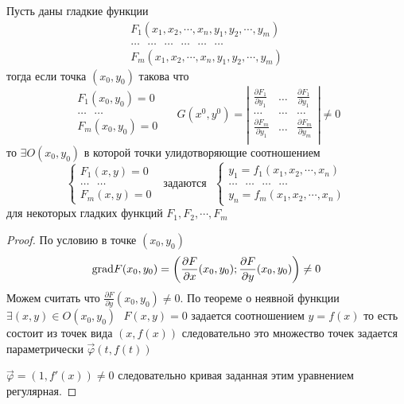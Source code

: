 \begin{theorem}
  Пусть  даны гладкие функции
  $$
  \begin{array}{c}
    F_1 (x_1, x_2, \cdots, x_n, y_1, y_2, \cdots, y_m) \\
    \dots ~~~ \dots ~~~ \dots ~~~ \dots  ~~~ \dots ~~~ \dots \\
    F_m (x_1, x_2, \cdots, x_n, y_1, y_2, \cdots, y_m)
  \end{array}
  $$
  тогда если точка $(x_0, y_0)$ такова что
  $$
  \begin{array}{c}
    F_1(x_0, y_0) = 0 \\
    \ldots ~~~ \ldots \\
    F_m(x_0, y_0) = 0 \\
  \end{array} ~~~~~~
  G(x^0, y^0) = \left|
  \begin{array}{ccc}
    \frac{\partial F_1}{\partial y_1} & \dots &
    \frac{\partial F_1}{\partial y_1} \\

    \dots & \dots & \dots \\

    \frac{\partial F_m}{\partial y_1} & \dots &
    \frac{\partial F_m}{\partial y_m} \\
  \end{array}
  \right|
  \not= 0
  $$
  то $\exists O(x_0, y_0)$ в которой точки улидотворяющие соотношением
  $$
  \left\{
  \begin{array}{c}
    F_1(x, y) = 0 \\
    \dots ~~~ \dots \\
    F_m(x, y) = 0
  \end{array}
  \right. ~~~ \text{задаются} ~~~
  \left\{
  \begin{array}{c}
    y_1 = f_1(x_1, x_2, \cdots, x_n)\\
    \dots ~~~ \dots ~~~ \dots ~~~ \dots \\
    y_n = f_m(x_1, x_2, \cdots, x_n)
  \end{array}
  \right.
  $$
  для некоторых гладких функций $F_1, F_2, \cdots, F_m $
\end{theorem}

\begin{proof}
  По условию в точке $(x_0, y_0)$
  $$
  \mathrm{grad} F(x_0, y_0) = \left( \frac{\partial F}{\partial x}(x_0, y_0);
  \frac{\partial F}{\partial y}(x_0, y_0) \right) \not= 0
  $$
  Можем считать что $\frac{\partial F}{\partial y}(x_0, y_0) \not= 0$. По
  теореме о неявной функции $\exists (x, y) \in O(x_0, y_0) ~~~ F(x, y) = 0$
  задается соотношением $y = f(x)$
  то есть состоит из точек вида $(x, f(x))$ следовательно это множество точек
  задается параметрически $\vec \varphi (t, f(t))$

  $\vec \varphi = (1, f'(x)) \not= 0$ следовательно кривая заданная этим
  уравнением регулярная.
\end{proof}

